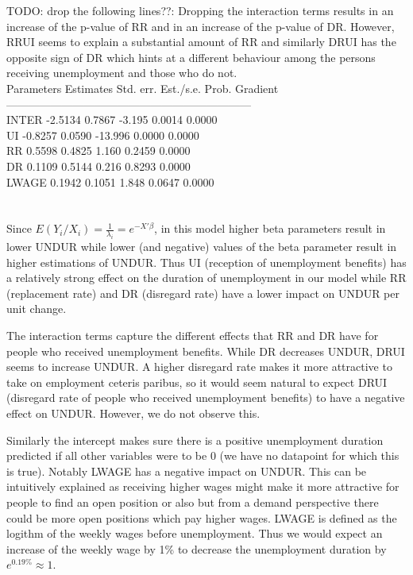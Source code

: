 \documentclass[11pt]{article}
\theoremstyle{break}
\begin{document}
TODO: drop the following lines??: Dropping the interaction terms results in an increase of the p-value of RR and in an increase of the p-value of DR. However, RRUI seems to explain a substantial amount of RR and similarly DRUI has the opposite sign of DR which hints at a different behaviour among the persons receiving unemployment and those who do not.  \\
Parameters    Estimates     Std. err.  Est./s.e.  Prob.    Gradient \\
------------------------------------------------------------------ \\
INTER           -2.5134        0.7867   -3.195   0.0014      0.0000 \\
UI              -0.8257        0.0590  -13.996   0.0000      0.0000 \\
RR               0.5598        0.4825    1.160   0.2459      0.0000 \\
DR               0.1109        0.5144    0.216   0.8293      0.0000 \\
LWAGE            0.1942        0.1051    1.848   0.0647      0.0000 \\
\\
\\

Since $E(Y_i/X_i) = \frac{1}{\lambda_i} = e^{-X'\beta}$, in this model higher beta parameters result in lower UNDUR while lower (and negative) values of the beta parameter result in higher estimations of UNDUR.
Thus UI (reception of unemployment benefits) has a relatively strong effect on the duration of unemployment in our model while RR (replacement rate) and DR (disregard rate) have a lower impact on UNDUR per unit change.

The interaction terms capture the different effects that RR and DR have for people who received unemployment benefits. While DR decreases UNDUR, DRUI seems to increase UNDUR. A higher disregard rate makes it more attractive to take on employment ceteris paribus, so it would seem natural to expect DRUI (disregard rate of people who received unemployment benefits) to have a negative effect on UNDUR. However, we do not observe this.

Similarly the intercept makes sure there is a positive unemployment duration predicted if all other variables were to be 0 (we have no datapoint for which this is true). Notably LWAGE has a negative impact on UNDUR. This can be intuitively explained as receiving higher wages might make it more attractive for people to find an open position or also but from a demand perspective there could be more open positions which pay higher wages. LWAGE is defined as the logithm of the weekly wages before unemployment. Thus we would expect an increase of the weekly wage by 1\% to decrease the unemployment duration by $e^{0.19\%} \approx 1$.
\end{document}
